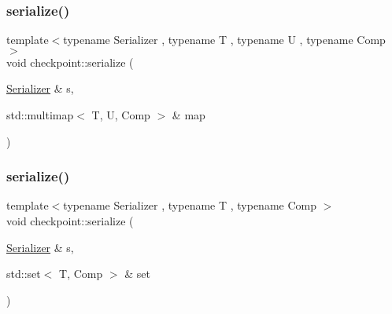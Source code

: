 \mbox{\label{namespacecheckpoint_a44434f578fc304afa3a62a9305be2a65}} 
\subsubsection{\texorpdfstring{serialize()}{serialize()}\hspace{0.1cm}{\footnotesize\ttfamily [19/25]}}
{\footnotesize\ttfamily template$<$typename Serializer , typename T , typename U , typename Comp $>$ \\
void checkpoint\+::serialize (\begin{DoxyParamCaption}\item[{\hyperlink{structcheckpoint_1_1_serializer}{Serializer} \&}]{s,  }\item[{std\+::multimap$<$ T, U, Comp $>$ \&}]{map }\end{DoxyParamCaption})\hspace{0.3cm}{\ttfamily [inline]}}

\mbox{\label{namespacecheckpoint_a9f1869781f4cce4db94c144174680b24}} 
\subsubsection{\texorpdfstring{serialize()}{serialize()}\hspace{0.1cm}{\footnotesize\ttfamily [20/25]}}
{\footnotesize\ttfamily template$<$typename Serializer , typename T , typename Comp $>$ \\
void checkpoint\+::serialize (\begin{DoxyParamCaption}\item[{\hyperlink{structcheckpoint_1_1_serializer}{Serializer} \&}]{s,  }\item[{std\+::set$<$ T, Comp $>$ \&}]{set }\end{DoxyParamCaption})\hspace{0.3cm}{\ttfamily [inline]}}

\mbox{\label{namespacecheckpoint_ae032265314cdf8e9155a6bbc423ca1c9}} 
